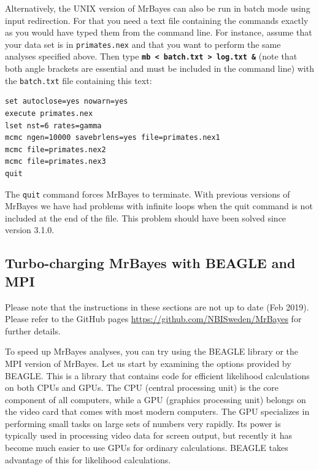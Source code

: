\documentclass[12pt]{book}
\newcommand{\ttt}[1]{\texttt{#1}}
\newcommand{\tb}[1]{\ttt{\textbf{#1}}}
\begin{document}
Alternatively, the UNIX version of MrBayes can also be run in batch mode using input redirection.
For that you need a text file containing the commands exactly as you would have typed them from the
command line. For instance, assume that your data set is in \ttt{primates.nex} and that you want to
perform the same analyses specified above. Then type \tb{mb < batch.txt > log.txt \&} (note that
both angle brackets are essential and must be included in the command line) with the
\ttt{batch.txt} file containing this text:

\begin{singlespacing}
\footnotesize
\begin{verbatim}
set autoclose=yes nowarn=yes
execute primates.nex
lset nst=6 rates=gamma
mcmc ngen=10000 savebrlens=yes file=primates.nex1
mcmc file=primates.nex2
mcmc file=primates.nex3
quit
\end{verbatim}
\normalsize
\end{singlespacing}

The \ttt{quit} command forces MrBayes to terminate. With previous versions of MrBayes we have had
problems with infinite loops when the quit command is not included at the end of the file. This
problem should have been solved since version 3.1.0.



\subsection{Turbo-charging MrBayes with BEAGLE and MPI}
\vspace{5 pt}
{\large Please note that the instructions in these sections are not up to date
(Feb 2019). Please refer to the GitHub pages \url{https://github.com/NBISweden/MrBayes}
for further details.}
\vspace{5 pt}

To speed up MrBayes analyses, you can try using the BEAGLE library or the MPI version of MrBayes.
Let us start by examining the options provided by BEAGLE. This is a library that contains code for
efficient likelihood calculations on both CPUs and GPUs. The CPU (central processing unit) is the
core component of all computers, while a GPU (graphics processing unit) belongs on the video card
that comes with most modern computers. The GPU specializes in performing small tasks on large sets
of numbers very rapidly. Its power is typically used in processing video data for screen output,
but recently it has become much easier to use GPUs for ordinary calculations. BEAGLE takes
advantage of this for likelihood calculations.
\end{document}
